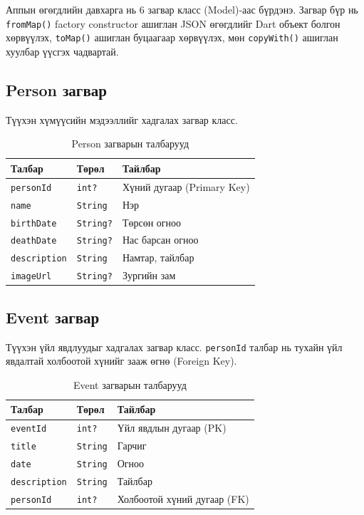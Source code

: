 Аппын өгөгдлийн давхарга нь 6 загвар класс (Model)-аас бүрдэнэ. Загвар бүр нь \texttt{fromMap()} factory constructor ашиглан JSON өгөгдлийг Dart объект болгон хөрвүүлэх, \texttt{toMap()} ашиглан буцаагаар хөрвүүлэх, мөн \texttt{copyWith()} ашиглан хуулбар үүсгэх чадвартай.

\subsection{Person загвар}

Түүхэн хүмүүсийн мэдээллийг хадгалах загвар класс.

\begin{table}[htbp]
\centering
\begin{tabular}{|p{3cm}|p{3cm}|p{7.5cm}|}
\hline
\textbf{Талбар} & \textbf{Төрөл} & \textbf{Тайлбар} \\
\hline
\texttt{personId} & \texttt{int?} & Хүний дугаар (Primary Key) \\
\hline
\texttt{name} & \texttt{String} & Нэр \\
\hline
\texttt{birthDate} & \texttt{String?} & Төрсөн огноо \\
\hline
\texttt{deathDate} & \texttt{String?} & Нас барсан огноо \\
\hline
\texttt{description} & \texttt{String} & Намтар, тайлбар \\
\hline
\texttt{imageUrl} & \texttt{String?} & Зургийн зам \\
\hline
\end{tabular}
\caption{Person загварын талбарууд}
\label{tab:person_model}
\end{table}

\subsection{Event загвар}

Түүхэн үйл явдлуудыг хадгалах загвар класс. \texttt{personId} талбар нь тухайн үйл явдалтай холбоотой хүнийг зааж өгнө (Foreign Key).

\begin{table}[htbp]
\centering
\begin{tabular}{|p{3cm}|p{3cm}|p{7.5cm}|}
\hline
\textbf{Талбар} & \textbf{Төрөл} & \textbf{Тайлбар} \\
\hline
\texttt{eventId} & \texttt{int?} & Үйл явдлын дугаар (PK) \\
\hline
\texttt{title} & \texttt{String} & Гарчиг \\
\hline
\texttt{date} & \texttt{String} & Огноо \\
\hline
\texttt{description} & \texttt{String} & Тайлбар \\
\hline
\texttt{personId} & \texttt{int?} & Холбоотой хүний дугаар (FK) \\
\hline
\end{tabular}
\caption{Event загварын талбарууд}
\label{tab:event_model}
\end{table}

